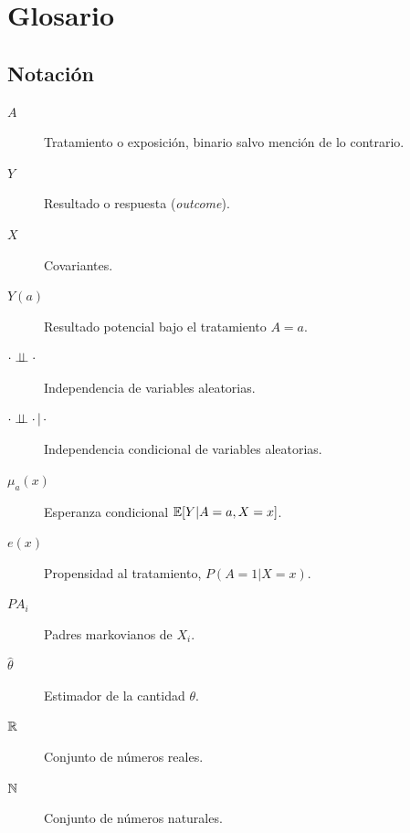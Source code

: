 
\chapter*{Glosario}

\section*{Notación}
\begin{description}
    \item[$A$] Tratamiento o exposición, binario salvo mención de lo contrario.
    \item[$Y$] Resultado o respuesta (\textit{outcome}).
    \item[$X$] Covariantes.
    \item[$Y(a)$] Resultado potencial bajo el tratamiento $A = a$.
    \item[$\cdot \mathrel{\perp\!\!\!\perp} \cdot$] Independencia de variables aleatorias.
    \item[$\cdot \mathrel{\perp\!\!\!\perp} \cdot \, | \, \cdot $] Independencia condicional de variables aleatorias.
    \item[$\mu_a(x)$] Esperanza condicional $\mathbb{E}[Y | A = a, X = x]$.
    \item[$e(x)$] Propensidad al tratamiento, $P(A = 1 | X = x)$.
    \item[$PA_i$] Padres markovianos de $X_i$.
    \item[$\hat \theta$] Estimador de la cantidad $\theta$.
    \item[$\mathbb{R}$] Conjunto de números reales.
    \item[$\mathbb{N}$] Conjunto de números naturales.
\end{description}

